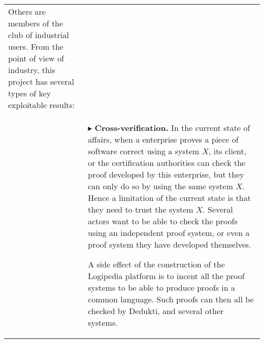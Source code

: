 \begin{longtable}{|p{}|p{}|}
Others are members of the club of
industrial users.  From the point of view of industry, this
project has several types of key exploitable results:\\
&
$\blacktriangleright$
{\bf Cross-verification.}
In the current state of affairs, when a enterprise proves a piece of
software correct using a system $X$, its client, or the certification
authorities can check the proof developed by this enterprise, but they
can only do so by using the same system $X$. Hence a limitation of
the current state is that they need to trust the system $X$.
Several actors want to be able to check the proofs using an
independent proof system, or even a proof system they have developed
themselves.

A side effect of the construction of the Logipedia platform is
to incent all the proof systems to be able to produce proofs in a
common language. Such proofs can then all be checked by
Dedukti, and several other systems.


\end{longtable}
